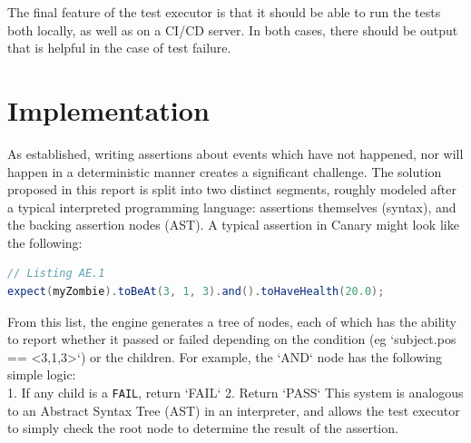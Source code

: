 \documentclass{article}
\begin{document}
\begin{doublespacing}
The final feature of the test executor is that it should be able to run the tests both locally, as well as on a CI/CD server. In both cases, there should be output that is helpful in the case of test failure. 


\section{Implementation}

As established, writing assertions about events which have not happened, nor will happen in a deterministic manner creates a significant challenge. The solution proposed in this report is split into two distinct segments, roughly modeled after a typical interpreted programming language: assertions themselves (syntax), and the backing assertion nodes (AST). A typical assertion in Canary might look like the following:
\begin{lstlisting}[language=Java]
// Listing AE.1
expect(myZombie).toBeAt(3, 1, 3).and().toHaveHealth(20.0);
\end{lstlisting}

From this list, the engine generates a tree of nodes, each of which has the ability to report whether it passed or failed depending on the condition (eg `subject.pos == <3,1,3>`) or the children. For example, the `AND` node has the following simple logic:  \\
    1. If any child is a \verb|FAIL|, return `FAIL`
    2. Return `PASS`
This system is analogous to an Abstract Syntax Tree (AST) in an interpreter, and allows the test executor to simply check the root node to determine the result of the assertion.


\end{doublespacing}
\end{document}
